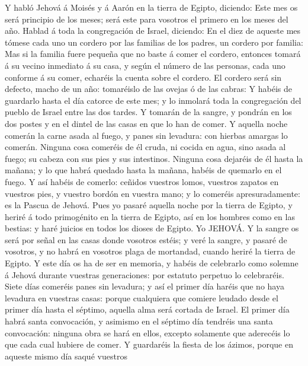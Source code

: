  Y habló Jehová á Moisés y á Aarón en la tierra de Egipto,
diciendo:  Este mes os será principio de los meses; será
este para vosotros el primero en los meses del año.  Hablad
á toda la congregación de Israel, diciendo: En el diez de aqueste mes
tómese cada uno un cordero por las familias de los padres, un cordero
por familia:  Mas si la familia fuere pequeña que no baste á
comer el cordero, entonces tomará á su vecino inmediato á su casa, y
según el número de las personas, cada uno conforme á su comer, echaréis
la cuenta sobre el cordero.  El cordero será sin defecto,
macho de un año: tomaréislo de las ovejas ó de las cabras: 
Y habéis de guardarlo hasta el día catorce de este mes; y lo inmolará
toda la congregación del pueblo de Israel entre las dos tardes.
 Y tomarán de la sangre, y pondrán en los dos postes y en el
dintel de las casas en que lo han de comer.  Y aquella noche
comerán la carne asada al fuego, y panes sin levadura: con hierbas
amargas lo comerán.  Ninguna cosa comeréis de él cruda, ni
cocida en agua, sino asada al fuego; su cabeza con sus pies y sus
intestinos.  Ninguna cosa dejaréis de él hasta la mañana; y
lo que habrá quedado hasta la mañana, habéis de quemarlo en el fuego.
 Y así habéis de comerlo: ceñidos vuestros lomos, vuestros
zapatos en vuestros pies, y vuestro bordón en vuestra mano; y lo
comeréis apresuradamente: es la Pascua de Jehová.  Pues yo
pasaré aquella noche por la tierra de Egipto, y heriré á todo
primogénito en la tierra de Egipto, así en los hombres como en las
bestias: y haré juicios en todos los dioses de Egipto. Yo JEHOVÁ.
 Y la sangre os será por señal en las casas donde vosotros
estéis; y veré la sangre, y pasaré de vosotros, y no habrá en vosotros
plaga de mortandad, cuando heriré la tierra de Egipto.  Y
este día os ha de ser en memoria, y habéis de celebrarlo como solemne á
Jehová durante vuestras generaciones: por estatuto perpetuo lo
celebraréis.  Siete días comeréis panes sin levadura; y así
el primer día haréis que no haya levadura en vuestras casas: porque
cualquiera que comiere leudado desde el primer día hasta el séptimo,
aquella alma será cortada de Israel.  El primer día habrá
santa convocación, y asimismo en el séptimo día tendréis una santa
convocación: ninguna obra se hará en ellos, excepto solamente que
aderecéis lo que cada cual hubiere de comer.  Y guardaréis
la fiesta de los ázimos, porque en aqueste mismo día saqué vuestros
